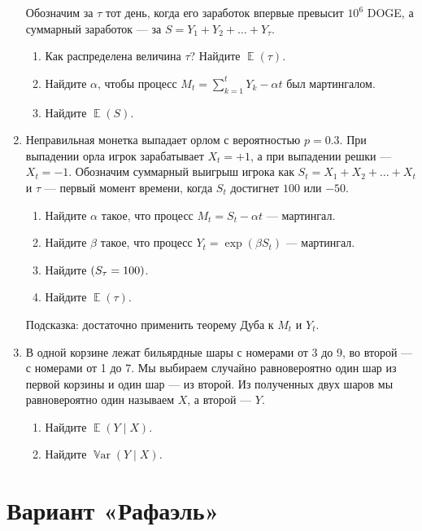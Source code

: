 \documentclass[12pt]{article}
\DeclareMathOperator{\Var}{\mathbb{V}ar}
\let\P\relax
\DeclareMathOperator{\P}{\mathbb{P}}
\DeclareMathOperator{\E}{\mathbb{E}}
\begin{document}
\begin{enumerate}
    Обозначим за $\tau$ тот день, когда его заработок впервые превысит $10^6$ DOGE,
    а суммарный заработок — за  $S = Y_1 + Y_2 + \dots + Y_\tau$.
    \begin{enumerate}
        \item Как распределена величина $\tau$? Найдите $\E(\tau)$.
        \item Найдите $\alpha$, чтобы процесс $M_t = \sum_{k=1}^t Y_k - \alpha t$ был мартингалом.
        \item Найдите $\E(S)$.
    \end{enumerate}
    
    \item Неправильная монетка выпадает орлом с вероятностью $p = 0.3$. 
    При выпадении орла игрок зарабатывает $X_t = +1$, а при выпадении решки — $X_t = -1$.
    Обозначим суммарный выигрыш игрока как $S_t = X_1 + X_2 + \dots + X_t$ и $\tau$ — первый момент времени, когда $S_t$ достигнет $100$ или $-50$.

    \begin{enumerate}
        \item Найдите $\alpha$ такое, что процесс $M_t = S_t - \alpha t$ — мартингал. 
        \item Найдите $\beta$ такое, что процесс $Y_t = \exp(\beta S_t)$ — мартингал. 
        \item Найдите $\P(S_\tau = 100)$.
        \item Найдите $\E(\tau)$.
    \end{enumerate}

    Подсказка: достаточно применить теорему Дуба к $M_t$ и $Y_t$.

    \item В одной корзине лежат бильярдные шары с номерами от 3 до 9, во второй — с номерами от 1 до 7. 
    Мы выбираем случайно равновероятно один шар из первой корзины и один шар — из второй. 
    Из полученных двух шаров мы равновероятно один называем $X$, а второй — $Y$.
    \begin{enumerate}
        \item Найдите $\E(Y \mid X)$.
        \item Найдите $\Var(Y \mid X)$.
    \end{enumerate}
    

\end{enumerate}


\section*{Вариант «Рафаэль»}
\end{document}
